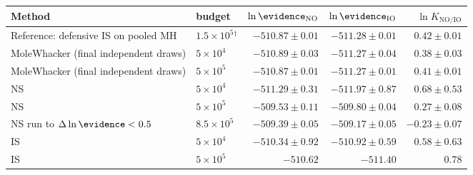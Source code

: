 \begin{tabular}{@{}llrrr@{}}
  \toprule
  Method & budget & \(\ln\evidence_{\mathrm{NO}}\) & \(\ln\evidence_{\mathrm{IO}}\) & \(\ln K_{\mathrm{NO/IO}}\) \\
  \midrule
  Reference: defensive IS on pooled MH & \(1.5\times 10^{5}\)\(^{\dagger}\) & \(-510.87 \pm 0.01\) & \(-511.28 \pm 0.01\) & \(0.42 \pm 0.01\) \\
  \midrule
  MoleWhacker (final independent draws) & \(5 \times 10^{4}\) & \(-510.89 \pm 0.03\) & \(-511.27 \pm 0.04\) & \(0.38 \pm 0.03\) \\
  MoleWhacker (final independent draws) & \(5 \times 10^{5}\) & \(-510.87 \pm 0.01\) & \(-511.27 \pm 0.01\) & \(0.41 \pm 0.01\) \\
  NS & \(5 \times 10^{4}\) & \(-511.29 \pm 0.31\) & \(-511.97 \pm 0.87\) & \(0.68 \pm 0.53\) \\
  NS & \(5 \times 10^{5}\) & \(-509.53 \pm 0.11\) & \(-509.80 \pm 0.04\) & \(0.27 \pm 0.08\) \\
  NS run to \(\Delta\ln\evidence < 0.5\) & \(8.5\times 10^{5}\) & \(-509.39 \pm 0.05\) & \(-509.17 \pm 0.05\) & \(-0.23 \pm 0.07\) \\
  IS & \(5 \times 10^{4}\) & \(-510.34 \pm 0.92\) & \(-510.92 \pm 0.59\) & \(0.58 \pm 0.63\) \\
  IS & \(5 \times 10^{5}\) & \(-510.62\) & \(-511.40\) & \(0.78\) \\
  \bottomrule
\end{tabular}
